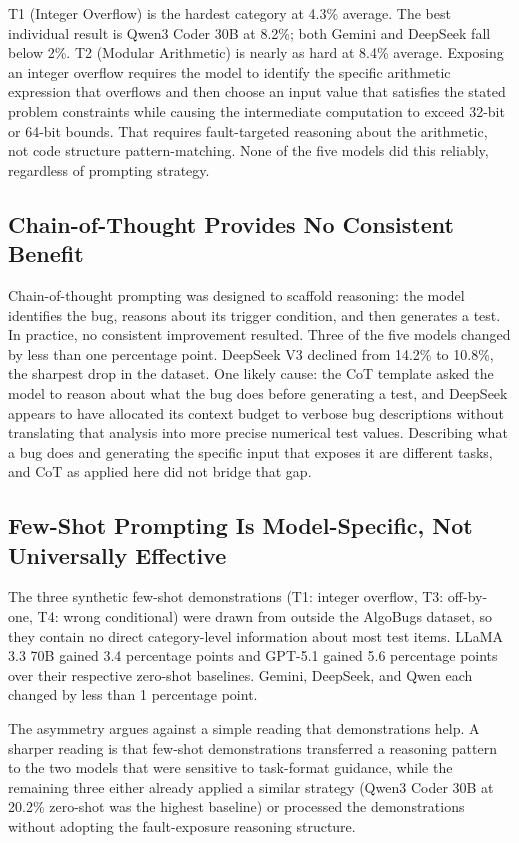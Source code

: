 T1 (Integer Overflow) is the hardest category at 4.3\% average. The best individual result is Qwen3 Coder 30B at 8.2\%; both Gemini and DeepSeek fall below 2\%. T2 (Modular Arithmetic) is nearly as hard at 8.4\% average. Exposing an integer overflow requires the model to identify the specific arithmetic expression that overflows and then choose an input value that satisfies the stated problem constraints while causing the intermediate computation to exceed 32-bit or 64-bit bounds. That requires fault-targeted reasoning about the arithmetic, not code structure pattern-matching. None of the five models did this reliably, regardless of prompting strategy.

\subsection{Chain-of-Thought Provides No Consistent Benefit}

Chain-of-thought prompting was designed to scaffold reasoning: the model identifies the bug, reasons about its trigger condition, and then generates a test. In practice, no consistent improvement resulted. Three of the five models changed by less than one percentage point. DeepSeek V3 declined from 14.2\% to 10.8\%, the sharpest drop in the dataset. One likely cause: the CoT template asked the model to reason about what the bug does before generating a test, and DeepSeek appears to have allocated its context budget to verbose bug descriptions without translating that analysis into more precise numerical test values. Describing what a bug does and generating the specific input that exposes it are different tasks, and CoT as applied here did not bridge that gap.

\subsection{Few-Shot Prompting Is Model-Specific, Not Universally Effective}

The three synthetic few-shot demonstrations (T1: integer overflow, T3: off-by-one, T4: wrong conditional) were drawn from outside the AlgoBugs dataset, so they contain no direct category-level information about most test items. LLaMA 3.3 70B gained 3.4 percentage points and GPT-5.1 gained 5.6 percentage points over their respective zero-shot baselines. Gemini, DeepSeek, and Qwen each changed by less than 1 percentage point.

The asymmetry argues against a simple reading that demonstrations help. A sharper reading is that few-shot demonstrations transferred a reasoning pattern to the two models that were sensitive to task-format guidance, while the remaining three either already applied a similar strategy (Qwen3 Coder 30B at 20.2\% zero-shot was the highest baseline) or processed the demonstrations without adopting the fault-exposure reasoning structure.

